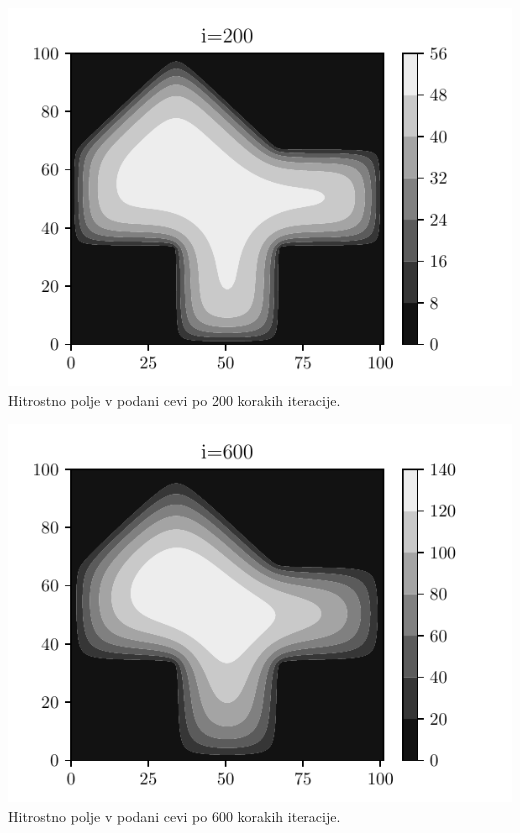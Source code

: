 \begin{center}
    \begin{minipage}{0.45\textwidth}
        \centering
    \includegraphics[width=\textwidth]{../old/1-hiska_i200.pdf}
    {Hitrostno polje v podani cevi po 200 korakih iteracije.}
    \end{minipage}\hfill
    \begin{minipage}{0.45\textwidth}
        \centering
        \includegraphics[width=1\textwidth]{../old/1-hiska_i600.pdf}
    {Hitrostno polje v podani cevi po 600 korakih iteracije. }
    \end{minipage}


\end{center}
